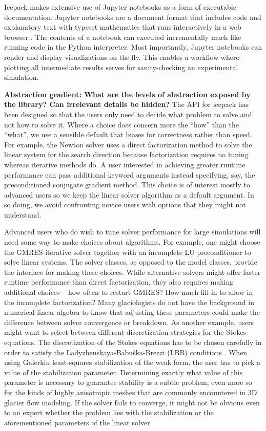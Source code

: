 \documentclass[journal abbreviation, manuscript]{copernicus}
\begin{document}
Icepack makes extensive use of Jupyter notebooks as a form of executable documentation.
Jupyter notebooks are a document format that includes code and explanatory text with typeset mathematics that runs interactively in a web browser \citep{kluyver2016jupyter}.
The contents of a notebook can executed incrementally much like running code in the Python interpreter.
Most importantly, Jupyter notebooks can render and display visualizations on the fly.
This enables a workflow where plotting all intermediate results serves for sanity-checking an experimental simulation.

\textbf{Abstraction gradient: What are the levels of abstraction exposed by the library?
Can irrelevant details be hidden?}
The API for icepack has been designed so that the users only need to decide what problem to solve and not how to solve it.
Where a choice does concern more the ``how'' than the ``what'', we use a sensible default that biases for correctness rather than speed.
For example, the Newton solver uses a direct factorization method to solve the linear system for the search direction because factorization requires no tuning whereas iterative methods do.
A user interested in achieving greater runtime performance can pass additional keyword arguments instead specifying, say, the preconditioned conjugate gradient method.
This choice is of interest mostly to advanced users so we keep the linear solver algorithm as a default argument.
In so doing, we avoid confronting novice users with options that they might not understand.

Advanced users who do wish to tune solver performance for large simulations will need some way to make choices about algorithms.
For example, one might choose the GMRES iterative solver together with an incomplete LU preconditioner to solve linear systems.
The solver classes, as opposed to the model classes, provide the interface for making these choices.
While alternative solvers might offer faster runtime performance than direct factorization, they also requires making additional choices -- how often to restart GMRES?
How much fill-in to allow in the incomplete factorization?
Many glaciologists do not have the background in numerical linear algebra to know that adjusting these parameters could make the difference between solver convergence or breakdown.
As another example, users might want to select between different discretization strategies for the Stokes equations.
The discretization of the Stokes equations has to be chosen carefully in order to satisfy the Ladyzhenskaya-Babu\v{s}ka-Brezzi (LBB) conditions \citep{boffi2013mixed}.
When using Galerkin least-squares stabilization of the weak form, the user has to pick a value of the stabilization parameter.
Determining exactly what value of this parameter is necessary to guarantee stability is a subtle problem, even more so for the kinds of highly anisotropic meshes that are commonly encountered in 3D glacier flow modeling.
If the solver fails to converge, it might not be obvious even to an expert whether the problem lies with the stabilization or the aforementioned parameters of the linear solver.
\end{document}

